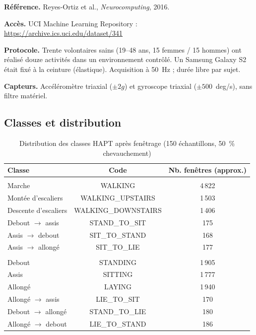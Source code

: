 \documentclass[a4paper,12pt]{report}
\begin{document}
\textbf{Référence.} Reyes-Ortiz et al., \emph{Neurocomputing}, 2016.

\textbf{Accès.} UCI Machine Learning Repository :
\url{https://archive.ics.uci.edu/dataset/341}

\textbf{Protocole.} Trente volontaires sains (19--48 ans, 15 femmes / 15 hommes)
ont réalisé douze activités dans un environnement contrôlé. Un Samsung Galaxy S2
était fixé à la ceinture (élastique). Acquisition à 50~Hz ; durée libre par sujet.

\textbf{Capteurs.} Accéléromètre triaxial ($\pm 2g$) et gyroscope triaxial
($\pm 500$~deg/s), sans filtre matériel.

\subsection{Classes et distribution}

\begin{table}[H]
\centering
\small
\begin{tabularx}{\textwidth}{|>{\raggedright\arraybackslash}Y|c|c|}
\hline
\textbf{Classe} & \textbf{Code} & \textbf{Nb. fenêtres (approx.)} \\
\hline
{} \\
\hline
Marche & WALKING & 4\,822 \\
Montée d'escaliers & WALKING\_UPSTAIRS & 1\,503 \\
Descente d'escaliers & WALKING\_DOWNSTAIRS & 1\,406 \\
Debout $\rightarrow$ assis & STAND\_TO\_SIT & 175 \\
Assis $\rightarrow$ debout & SIT\_TO\_STAND & 168 \\
Assis $\rightarrow$ allongé & SIT\_TO\_LIE & 177 \\
\hline
{} \\
\hline
Debout & STANDING & 1\,905 \\
Assis & SITTING & 1\,777 \\
Allongé & LAYING & 1\,940 \\
Allongé $\rightarrow$ assis & LIE\_TO\_SIT & 170 \\
Debout $\rightarrow$ allongé & STAND\_TO\_LIE & 180 \\
Allongé $\rightarrow$ debout & LIE\_TO\_STAND & 186 \\
\hline
\end{tabularx}
\caption{Distribution des classes HAPT après fenêtrage (150 échantillons, 50~\% chevauchement)}
\label{tab:annexe_hapt_classes}
\end{table}
\end{document}
